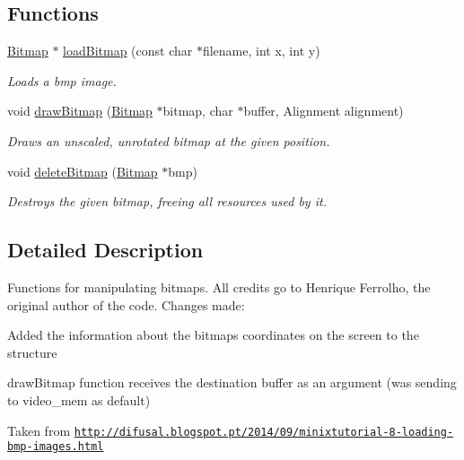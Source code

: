 \subsection*{Functions}
\begin{DoxyCompactItemize}
\item 
\hyperlink{struct_bitmap}{Bitmap} $\ast$ \hyperlink{group___bitmap_gad47a5ba782d17f94ad9f08956d61660a}{load\+Bitmap} (const char $\ast$filename, int x, int y)
\begin{DoxyCompactList}\small\item\em Loads a bmp image. \end{DoxyCompactList}\item 
void \hyperlink{group___bitmap_gaff908de4d166dac85027695204508ff4}{draw\+Bitmap} (\hyperlink{struct_bitmap}{Bitmap} $\ast$bitmap, char $\ast$buffer, Alignment alignment)
\begin{DoxyCompactList}\small\item\em Draws an unscaled, unrotated bitmap at the given position. \end{DoxyCompactList}\item 
void \hyperlink{group___bitmap_ga08c1d4f4fff81df260d979ea8fc1aa61}{delete\+Bitmap} (\hyperlink{struct_bitmap}{Bitmap} $\ast$bmp)
\begin{DoxyCompactList}\small\item\em Destroys the given bitmap, freeing all resources used by it. \end{DoxyCompactList}\end{DoxyCompactItemize}


\subsection{Detailed Description}
Functions for manipulating bitmaps. All credits go to Henrique Ferrolho, the original author of the code. Changes made\+: 


\begin{DoxyItemize}
\item Added the information about the bitmap\textquotesingle{}s coordinates on the screen to the structure
\item draw\+Bitmap function receives the destination buffer as an argument (was sending to video\+\_\+mem as default)
\end{DoxyItemize}

Taken from \href{http://difusal.blogspot.pt/2014/09/minixtutorial-8-loading-bmp-images.html}{\tt http\+://difusal.\+blogspot.\+pt/2014/09/minixtutorial-\/8-\/loading-\/bmp-\/images.\+html} 

